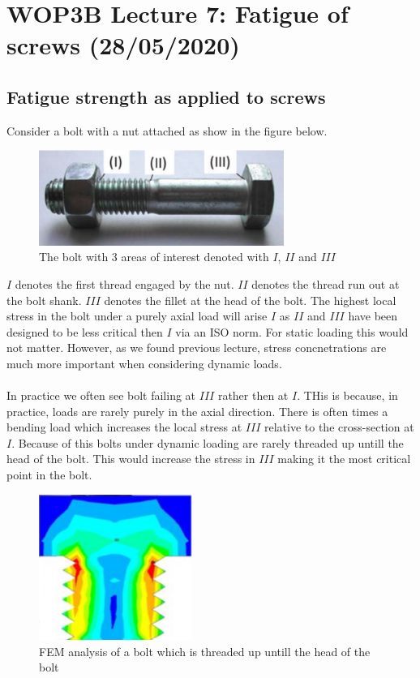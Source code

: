 \documentclass[11pt, a4paper]{article}
\begin{document}
\setcounter{equation}{0}
\setcounter{section}{6}

\section{WOP3B Lecture 7: Fatigue of screws (28/05/2020)}

\subsection{Fatigue strength as applied to screws}
Consider a bolt with a nut attached as show in the figure below.
\begin{figure}[h]
  \centerline{\includegraphics[width=80mm]{images/Bolt.png}}
  \caption{The bolt with 3 areas of interest denoted with $I$, $II$ and $III$}
\end{figure}
$I$ denotes the first thread engaged by the nut. $II$ denotes the thread run out at the bolt shank. $III$ denotes the fillet at the head of the bolt. The highest local stress in the bolt under a purely axial load will arise $I$ as $II$ and $III$ have been designed to be less critical then $I$ via an ISO norm. For static loading this would not matter. However, as we found previous lecture, stress concnetrations are much more important when considering dynamic loads.\\
\\
In practice we often see bolt failing at $III$ rather then at $I$. THis is because, in practice, loads are rarely purely in the axial direction. There is often times a bending load which increases the local stress at $III$ relative to the cross-section at $I$. Because of this bolts under dynamic loading are rarely threaded up untill the head of the bolt. This would increase the stress in $III$ making it the most critical point in the bolt.
\begin{figure}[h]
  \centerline{\includegraphics[width=50mm]{images/FEM.png}}
  \caption{FEM analysis of a bolt which is threaded up untill the head of the bolt}
\end{figure}
\end{document}

